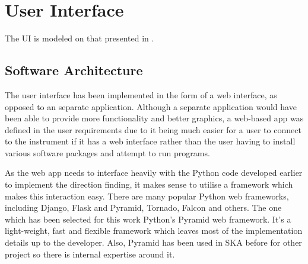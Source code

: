 \chapter{User Interface}
\label{ch:user-interface}
\graphicspath{{./img/user-interface/}}

The UI is modeled on that presented in \cite{guerin2012passive}.

\section{Software Architecture}
The user interface has been implemented in the form of a web interface, as opposed to an separate application. Although a separate application would have been able to provide more functionality and better graphics, a web-based app was defined in the user requirements due to it being much easier for a user to connect to the instrument if it has a web interface rather than the user having to install various software packages and attempt to run programs.

As the web app needs to interface heavily with the Python code developed earlier to implement the direction finding, it makes sense to utilise a framework which makes this interaction easy. There are many popular Python web frameworks, including Django, Flask and Pyramid, Tornado, Falcon and others. The one which has been selected for this work Python's Pyramid web framework. It's a light-weight, fast and flexible framework which leaves most of the implementation details up to the developer. Also, Pyramid has been used in SKA before for other project so there is internal expertise around it. 



